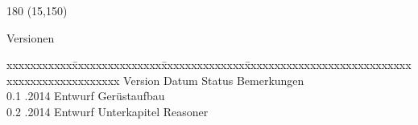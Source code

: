 
\begin{textblock}{180} (15,150)
\color{black}
\begin{huge}
Versionen
\end{huge}
\vspace{10mm}

\fontsize{10pt}{18pt}\selectfont
\begin{tabbing}
xxxxxxxxxxx\=xxxxxxxxxxxxxxx\=xxxxxxxxxxxxxx\=xxxxxxxxxxxxxxxxxxxxxxxxxxxxxxxxxxxxxxxxxxxxxxx \kill
Version	\> Datum	\> Status		\> Bemerkungen		\\
0.1	.2014	\> Entwurf		\> Gerüstaufbau	\\	
0.2	.2014	\> Entwurf		\> Unterkapitel Reasoner	\\	
\end{tabbing}

\end{textblock}
